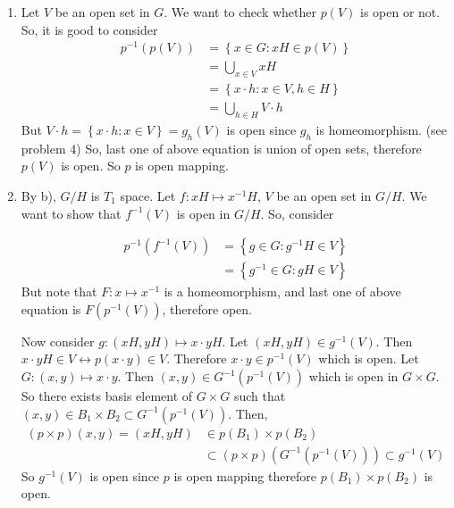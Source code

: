 \begin{problem}[5]
\begin{enumerate}[label = (\alph*)]
\item Let $V$ be an open set in $G$. We want to check whether $p(V)$ is open or not. So, it is good to consider
	\begin{equation*}
		\begin{split}
			p^{-1}\left( p(V) \right) & = \left\{ x \in G : xH \in p(V) \right\} \\
			& = \bigcup_{x \in V} xH \\
			& = \left\{ x\cdot h : x \in V, h\in H \right\} \\
			& = \bigcup_{h\in H} V \cdot h
		\end{split}
		\label{<+label+>}
	\end{equation*}
	But $V \cdot h = \left\{ x\cdot h : x \in V \right\} = g_h \left( V \right)$ is open since $g_h$ is homeomorphism. (see problem 4)
	So, last one of above equation is union of open sets, therefore $p(V)$ is open. So $p$ is open mapping.

\item By b), $G/H$ is $T_1$ space. Let $f: xH \mapsto x^{-1}H$, $V$ be an open set in $G/H$. We want to show that $f^{-1}\left( V \right)$ is open in $G/H$. So, consider 

	\begin{equation*}
		\begin{split}
			p^{-1} \left( f^{-1} \left( V \right) \right) & = \left\{ g \in G : g^{-1}H \in V \right\} \\
			& = \left\{ g^{-1} \in G : gH \in V \right\}
		\end{split}
	\end{equation*}
	But note that $F : x \mapsto x^{-1}$ is a homeomorphism, and last one of above equation is $F\left( p^{-1} \left( V \right) \right)$, therefore open.

	Now consider $g: \left( xH, yH \right) \mapsto x\cdot y H$. Let $\left( xH, yH \right) \in g^{-1}\left( V \right)$. Then $x\cdot y H \in V \leftrightarrow p\left( x\cdot y \right) \in V$. Therefore $x\cdot y \in p^{-1}\left( V \right)$ which is open. Let $G: \left( x, y \right) \mapsto x\cdot y$. Then $\left( x, y \right) \in G^{-1}\left( p^{-1}(V) \right)$ which is open in $G \times G$. So there exists basis element of $G \times G$ such that $\left( x, y \right) \in B_1 \times B_2 \subset G^{-1} \left(  p^{-1} \left( V \right) \right)$. Then, 
	\begin{equation*}
		\begin{split}
			(p \times p)\left( x, y \right) = \left( xH, yH \right) & \in p\left( B_1 \right) \times p\left( B_2 \right) \\
			& \subset \left( p\times p \right)\left( G^{-1} \left(  p^{-1} \left( V \right) \right) \right) \subset g^{-1}\left( V \right)
	\end{split}
		\label{<+label+>}
	\end{equation*}
	So $g^{-1}\left( V \right)$ is open since $p$ is open mapping therefore $p(B_1) \times p(B_2)$ is open.
	\end{enumerate}
	
\end{problem}
